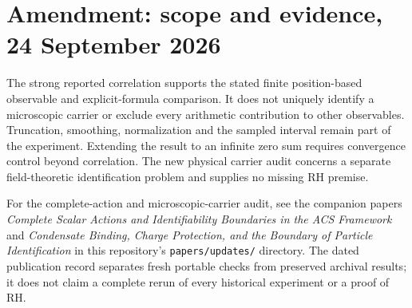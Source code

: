 \documentclass[11pt]{article}
\begin{document}
\section*{Amendment: scope and evidence, 24 September 2026}
The strong reported correlation supports the stated finite position-based observable and explicit-formula comparison. It does not uniquely identify a microscopic carrier or exclude every arithmetic contribution to other observables. Truncation, smoothing, normalization and the sampled interval remain part of the experiment. Extending the result to an infinite zero sum requires convergence control beyond correlation. The new physical carrier audit concerns a separate field-theoretic identification problem and supplies no missing RH premise.

For the complete-action and microscopic-carrier audit, see the companion
papers \emph{Complete Scalar Actions and Identifiability Boundaries in the ACS
Framework} and \emph{Condensate Binding, Charge Protection, and the Boundary
of Particle Identification} in this repository's \texttt{papers/updates/}
directory. The dated publication record separates fresh portable checks
from preserved archival results; it does not claim a complete rerun of every
historical experiment or a proof of RH.
\end{document}
